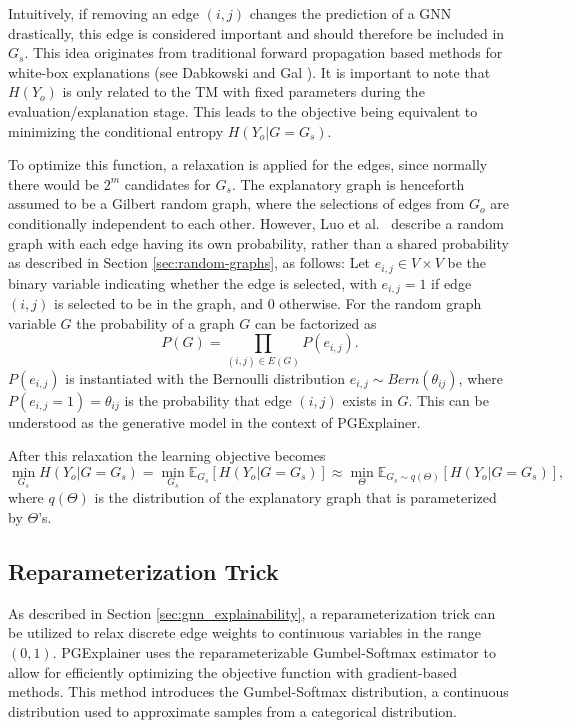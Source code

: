 Intuitively, if removing an edge $(i,j)$ changes the prediction of a GNN drastically, this edge is considered important and should therefore be included in $G_s$. This idea originates from traditional forward propagation based methods for white-box explanations (see Dabkowski and Gal \cite{dabkowski2017real}).
It is important to note that $H(Y_o)$ is only related to the \ac{TM} with fixed parameters during the evaluation/explanation stage. This leads to the objective being equivalent to minimizing the conditional entropy $H(Y_o|G=G_s)$. \bigskip

To optimize this function, a relaxation is applied for the edges, since normally there would be $2^m$ candidates for $G_s$. The explanatory graph is henceforth assumed to be a Gilbert random graph, where the selections of edges from $G_o$ are conditionally independent to each other. However, Luo et al.~\cite{luo2020parameterized} describe a random graph with each edge having its own probability, rather than a shared probability as described in Section \ref{sec:random-graphs}, as follows: Let $e_{i,j}\in V \times V$ be the binary variable indicating whether the edge is selected, with $e_{i,j} = 1$ if edge $(i,j)$ is selected to be in the graph, and 0 otherwise. For the random graph variable $G$ the probability of a graph $G$ can be factorized as 
\begin{equation}
    P(G) = \prod_{(i,j)\in E(G)}P(e_{i,j}).
\end{equation}
$P(e_{i,j})$ is instantiated with the Bernoulli distribution $e_{i,j} \sim Bern(\theta_{ij})$, where $P(e_{i,j} = 1) = \theta_{ij}$ is the probability that edge $(i,j)$ exists in $G$. This can be understood as the generative model in the context of PGExplainer.

After this relaxation the learning objective becomes
\begin{equation}
    \label{eq:init_learning_obj}
    \min_{G_s}H(Y_o|G = G_s) = \min_{G_s} \mathbb{E}_{G_s}[H(Y_o|G = G_s)] \approx \min_{\Theta} \mathbb{E}_{G_s \sim q(\Theta)}[H(Y_o|G = G_s)],
\end{equation}
where $q(\Theta)$ is the distribution of the explanatory graph that is parameterized by $\Theta$'s.

\subsection{Reparameterization Trick}
\label{sec:Reparameterization_Trick}
As described in Section \ref{sec:gnn_explainability}, a reparameterization trick can be utilized to relax discrete edge weights to continuous variables in the range $(0,1)$. PGExplainer uses the reparameterizable Gumbel-Softmax estimator \cite{jang2016categorical} to allow for efficiently optimizing the objective function with gradient-based methods. This method introduces the Gumbel-Softmax distribution, a continuous distribution used to approximate samples from a categorical distribution. 

